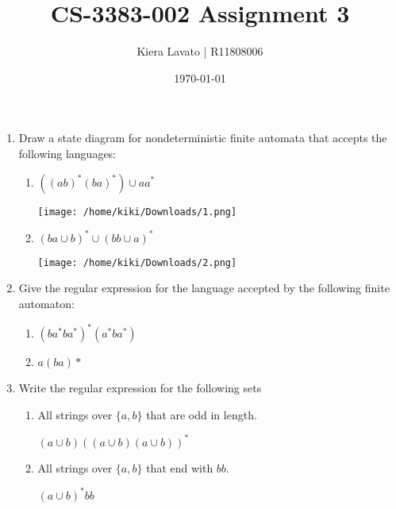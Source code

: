\documentclass[letterpaper,11pt]{article}
\title{CS-3383-002 Assignment 3}
\author{Kiera Lavato | R11808006}
\date{\today}
\begin{document}
    \maketitle
    
    \begin{enumerate}
        \item Draw a state diagram for nondeterministic finite automata that accepts the following languages:
        
        \begin{enumerate}
            \item $((ab)^*(ba)^*)\cup aa^*$
            
            \texttt{[image: /home/kiki/Downloads/1.png]}
            
            \item $(ba\cup b)^* \cup (bb\cup a)^*$
            
            \texttt{[image: /home/kiki/Downloads/2.png]}
        \end{enumerate}
        
        \newpage
        \item Give the regular expression for the language accepted by the following finite automaton:
        \begin{enumerate}
            \item $(ba^*ba^*)^*(a^*ba^*)$
            \item $a(ba)*$
        \end{enumerate}

        \item Write the regular expression for the following sets
        \begin{enumerate}
            \item All strings over $\{ a,b \}$ that are odd in length.
            
            $(a\cup b)((a\cup b)(a\cup b))^*$
            
            \item All strings over $\{ a,b \}$ that end with $bb$.
            
            $(a\cup b)^*bb$
            
        \end{enumerate}
    \end{enumerate}
    
\end{document}
